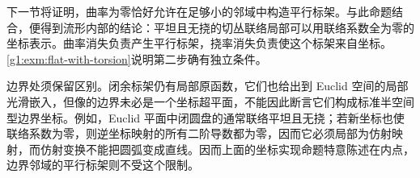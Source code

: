 下一节将证明，曲率为零恰好允许在足够小的邻域中构造平行标架。与此命题结合，便得到流形内部的结论：平坦且无挠的切丛联络局部可以用联络系数全为零的坐标表示。曲率消失负责产生平行标架，挠率消失负责使这个标架来自坐标。\cref{g1:exm:flat-with-torsion}说明第二步确有独立条件。

\ProseParagraphBreak

边界处须保留区别。闭余标架仍有局部原函数，它们也给出到 Euclid 空间的局部光滑嵌入，但像的边界未必是一个坐标超平面，不能因此断言它们构成标准半空间型边界坐标。例如，Euclid 平面中闭圆盘的通常联络平坦且无挠；若新坐标也使联络系数为零，则逆坐标映射的所有二阶导数都为零，因而它必须局部为仿射映射，而仿射变换不能把圆弧变成直线。因而上面的坐标实现命题特意陈述在内点，边界邻域的平行标架则不受这个限制。
